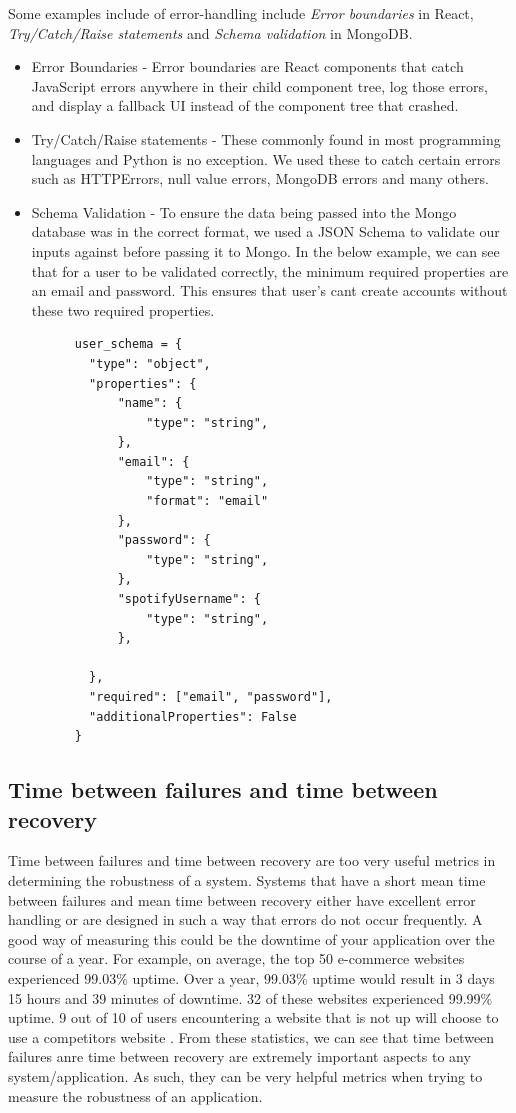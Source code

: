     Some examples include of error-handling include \textit{Error boundaries} in React, \textit{Try/Catch/Raise statements} and \textit{Schema validation} in MongoDB.

    \begin{itemize}
      \item Error Boundaries - Error boundaries are React components that catch JavaScript errors anywhere in their child component tree, log those errors, and display a fallback UI instead of the component tree that crashed.
      \item Try/Catch/Raise statements - These commonly found in most programming languages and Python is no exception. We used these to catch certain errors such as HTTPErrors, null value errors, MongoDB errors and many others.
      \item Schema Validation - To ensure the data being passed into the Mongo database was in the correct format, we used a JSON Schema to validate our inputs against before passing it to Mongo. In the below example, we can see that for a user 
      to be validated correctly, the minimum required properties are an email and password. This ensures that user's cant create accounts without these two required properties.
      \begin{verbatim}
      user_schema = {
        "type": "object",
        "properties": {
            "name": {
                "type": "string",
            },
            "email": {
                "type": "string",
                "format": "email"
            },
            "password": {
                "type": "string",
            },
            "spotifyUsername": {
                "type": "string",
            },
          
        },
        "required": ["email", "password"],
        "additionalProperties": False
      }
      \end{verbatim}
      
    \end{itemize}

    \subsection{Time between failures and time between recovery}
    Time between failures and time between recovery are too very useful metrics in determining the robustness of a system. Systems that have a short mean time between failures and mean time between recovery
    either have excellent error handling or are designed in such a way that errors do not occur frequently. A good way of measuring this could be 
    the downtime of your application over the course of a year. For example, on average, the top 50 e-commerce websites experienced 99.03\% uptime. Over a year, 99.03\% uptime would result in 3 days 15 hours and 39 minutes of downtime. 32 of
    these websites experienced 99.99\% uptime. 9 out of 10 of users encountering a website that is not up will choose to use a competitors website \cite{WebsiteDowntimeStats}. From these statistics, we can see that time between failures anre time between recovery are extremely important aspects to 
    any system/application. As such, they can be very helpful metrics when trying to measure the robustness of an application. 

